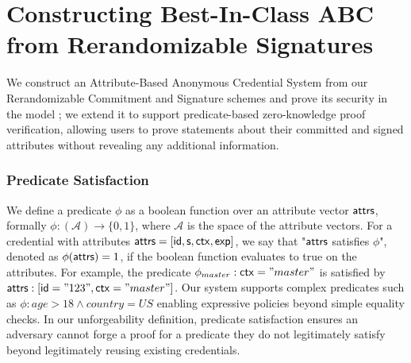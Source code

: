 \section{Constructing Best-In-Class ABC from Rerandomizable Signatures}\label{sec:abc}

We construct an Attribute-Based Anonymous Credential System from our Rerandomizable Commitment and Signature schemes and prove its security in the model \cite{fuchsbauer_structure-preserving_2019}; we extend it to support predicate-based zero-knowledge proof verification, allowing users to prove statements about their committed and signed attributes without revealing any additional information.


\subsubsection*{Predicate Satisfaction}
We define a predicate $\phi$ as a boolean function over an attribute vector $\mathsf{attrs}$, formally  $\phi: (\mathcal{A}) \rightarrow \{0,1\}$, where $\mathcal{A}$ is the space of the attribute vectors. 
For a credential with attributes $\mathsf{attrs} = [\mathsf{id}, \mathsf{s}, \mathsf{ctx}, \mathsf{exp}]$, we say that "$\mathsf{attrs}$ satisfies $\phi$", denoted as $\phi(\mathsf{attrs}) = 1$, if the boolean function evaluates to true on the attributes.
For example, the predicate $\phi_{master}:\mathsf{ctx} = "master"$ is satisfied by $\mathsf{attrs}: [\mathsf{id}="123", \mathsf{ctx}="master"]$. Our system supports complex predicates such as $\phi: age > 18 \wedge country = US$ enabling expressive policies beyond simple equality checks. In our unforgeability definition, predicate satisfaction ensures an adversary cannot forge a proof for a predicate they do not legitimately satisfy beyond legitimately reusing existing credentials.


